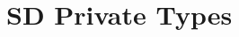 \hypertarget{group___s_d___private___types}{}\section{SD Private Types}
\label{group___s_d___private___types}
